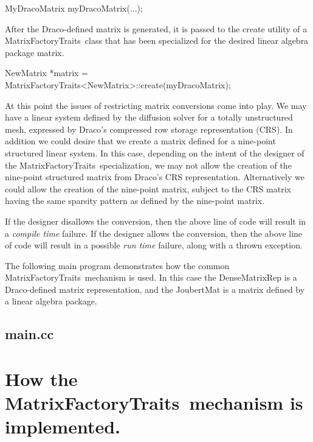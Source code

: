 \documentclass[11pt]{nmemo}
\newcommand{\cxxcode}{\color{codecolor}}
\newcommand{\code}[1]{\textcolor{codecolor}{#1}}
\newcommand{\MFT}{\code{MatrixFactoryTraits}\ }
\begin{document}
\begin{ttfamily}
\cxxcode
  MyDracoMatrix myDracoMatrix(...);
\end{ttfamily}

After the Draco-defined matrix is generated, it is passed to the
\code{create} utility of a \MFT class
that has been specialized for the desired linear algebra package matrix.

\begin{ttfamily}
\cxxcode
  NewMatrix *matrix = 
    MatrixFactoryTraits<NewMatrix>::create(myDracoMatrix);
\end{ttfamily}

At this point the issues of restricting matrix conversions come into
play.
We may have a linear system defined by the diffusion
solver for a totally unstructured mesh, expressed by Draco's compressed row
storage representation (CRS).
In addition we could desire that we create a matrix defined for a
nine-point structured linear system.
In this case, depending on the intent of the designer of the
\MFT specialization,
we may not allow the creation of the nine-point structured matrix
from Draco's CRS representation.
Alternatively we could allow the creation
of the nine-point matrix, subject to the CRS matrix having the same
sparsity pattern as defined by the nine-point matrix.

If the designer disallows the conversion, then the above line of code
will result in a \emph{compile time} failure.
If the designer allows the conversion, then the above line of code
will result in a possible \emph{run time} failure, along with
a thrown exception.

The following main program demonstrates how the common
\MFT mechanism is used.
In this case the \code{DenseMatrixRep} is a Draco-defined matrix
representation, and the \code{JoubertMat} is a matrix defined by a
linear algebra package.

\subsection{main.cc}

\begin{ttfamily}
\begin{small}
\cxxcode

\end{small}
\end{ttfamily}

\section{How the \MFT mechanism is implemented.}
\end{document}
